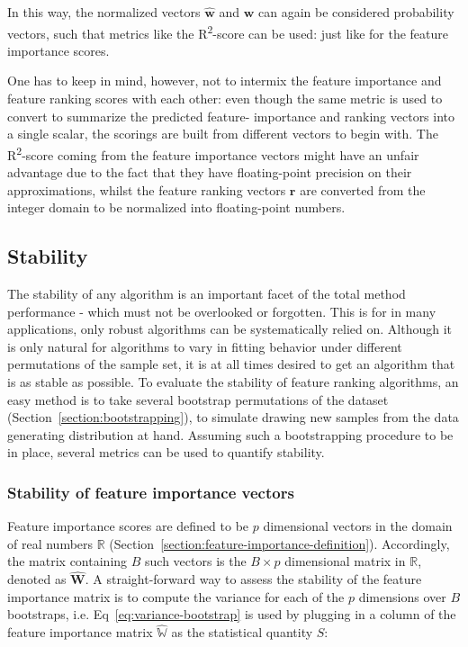 \documentclass[../main.tex]{subfiles}
\begin{document}
In this way, the normalized vectors $\hat{\boldsymbol{w}}$ and $\boldsymbol{w}$ can again be considered probability vectors, such that metrics like the R\textsuperscript{2}-score can be used: just like for the feature importance scores.

One has to keep in mind, however, not to intermix the feature importance and feature ranking scores with each other: even though the same metric is used to convert to summarize the predicted feature- importance and ranking vectors into a single scalar, the scorings are built from different vectors to begin with. The R\textsuperscript{2}-score coming from the feature importance vectors might have an unfair advantage due to the fact that they have floating-point precision on their approximations, whilst the feature ranking vectors $\boldsymbol{r}$ are converted from the integer domain to be normalized into floating-point numbers.





\subsection{Stability}
The stability of any algorithm is an important facet of the total method performance - which must not be overlooked or forgotten. This is for in many applications, only robust algorithms can be systematically relied on. Although it is only natural for algorithms to vary in fitting behavior under different permutations of the sample set, it is at all times desired to get an algorithm that is as stable as possible. To evaluate the stability of feature ranking algorithms, an easy method is to take several bootstrap permutations of the dataset (Section~\ref{section:bootstrapping}), to simulate drawing new samples from the data generating distribution at hand. Assuming such a bootstrapping procedure to be in place, several metrics can be used to quantify stability.



\subsubsection{Stability of feature importance vectors}\label{section:feature-importance-stability}
Feature importance scores are defined to be $p$ dimensional vectors in the domain of real numbers $\mathbb{R}$ (Section~\ref{section:feature-importance-definition}). Accordingly, the matrix containing $B$ such vectors is the $B \times p$ dimensional matrix in $\mathbb{R}$, denoted as $\hat{\mathbf{W}}$. A straight-forward way to assess the stability of the feature importance matrix is to compute the variance for each of the $p$ dimensions over $B$ bootstraps, i.e. Eq~\ref{eq:variance-bootstrap} is used by plugging in a column of the feature importance matrix $\hat{\mathbb{W}}$ as the statistical quantity $S$:
\end{document}
